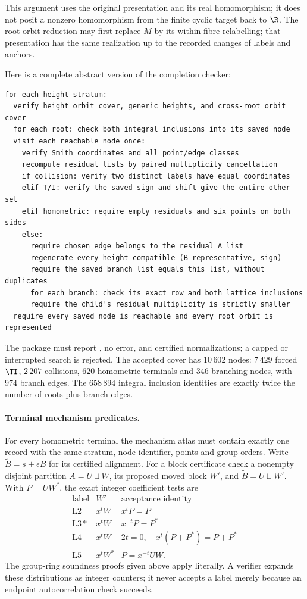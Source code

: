 This argument uses the original presentation and its real homomorphism;
it does not posit a nonzero homomorphism from the finite cyclic target
back to $\R$. The root-orbit reduction may first replace $M$ by its
within-fibre relabelling; that presentation has the same realization
up to the recorded changes of labels and anchors.

Here is a complete abstract version of the completion checker:
\begin{verbatim}
for each height stratum:
  verify height orbit cover, generic heights, and cross-root orbit cover
  for each root: check both integral inclusions into its saved node
  visit each reachable node once:
    verify Smith coordinates and all point/edge classes
    recompute residual lists by paired multiplicity cancellation
    if collision: verify two distinct labels have equal coordinates
    elif T/I: verify the saved sign and shift give the entire other set
    elif homometric: require empty residuals and six points on both sides
    else:
      require chosen edge belongs to the residual A list
      regenerate every height-compatible (B representative, sign)
      require the saved branch list equals this list, without duplicates
      for each branch: check its exact row and both lattice inclusions
      require the child's residual multiplicity is strictly smaller
  require every saved node is reachable and every root orbit is represented
\end{verbatim}
The package must report , no error, and certified
normalizations; a capped or interrupted search is rejected. The accepted
cover has $10\,602$ nodes: $7\,429$ forced $\TI$, $2\,207$ collisions,
$620$ homometric terminals and $346$ branching nodes, with $974$ branch
edges. The $658\,894$ integral inclusion identities are exactly twice
the number of roots plus branch edges.

\paragraph{Terminal mechanism predicates.}
For every homometric terminal the mechanism atlas must contain exactly
one record with the same stratum, node identifier, points and group orders.
Write $\widetilde B=s+\epsilon B$ for its certified alignment. For a
block certificate check a nonempty disjoint partition $A=U\sqcup W$,
its proposed moved block $W'$, and $\widetilde B=U\sqcup W'$.
With $P=UW^*$, the exact integer coefficient tests are
\[
\begin{array}{c|c|c}
\text{label}&W'&\text{acceptance identity}\\\hline
\mathrm{L2}&x^tW&x^tP=P\\
\mathrm{L3*}&x^tW&x^{-t}P=P^*\\
\mathrm{L4}&x^tW&2t=0,\quad x^t(P+P^*)=P+P^*\\
\mathrm{L5}&x^tW^*&P=x^{-t}UW .
\end{array}
\]
The group-ring soundness proofs given above apply literally. A verifier
expands these distributions as integer counters; it never accepts a label
merely because an endpoint autocorrelation check succeeds.

